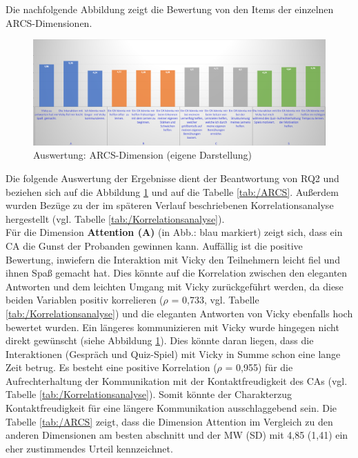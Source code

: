 Die nachfolgende Abbildung zeigt die Bewertung von den Items der einzelnen ARCS-Dimensionen.
\begin{figure}[H]
    \centering
    \includegraphics[width=1\linewidth]{images/Auswertung/ARCS.png}
   \caption[Auswertung: ARCS-Dimensionen ] {Auswertung: ARCS-Dimension (eigene Darstellung)}
  \label{fig:ARCS_Dimension}
\end{figure} 

Die folgende Auswertung der Ergebnisse dient der Beantwortung von RQ2 und beziehen sich auf die Abbildung \ref{fig:ARCS_Dimension}
und auf die Tabelle \ref{tab:/ARCS}. 
Außerdem wurden Bezüge zu der im späteren Verlauf beschriebenen Korrelationsanalyse hergestellt (vgl. Tabelle \ref{tab:/Korrelationsanalyse}).\\
Für die Dimension \textbf{Attention (A)} (in Abb.: blau markiert) zeigt sich, dass ein CA die Gunst der Probanden gewinnen kann.
Auffällig ist die positive Bewertung, inwiefern die Interaktion mit Vicky den Teilnehmern leicht fiel und ihnen Spaß gemacht hat.
Dies könnte auf die Korrelation zwischen den eleganten Antworten und dem leichten Umgang mit Vicky zurückgeführt werden, da
diese beiden Variablen positiv korrelieren ($\rho$ = 0,733, vgl. Tabelle \ref{tab:/Korrelationsanalyse}) und die eleganten Antworten von Vicky ebenfalls hoch bewertet wurden.
Ein längeres kommunizieren mit Vicky wurde hingegen nicht direkt gewünscht (siehe Abbildung \ref{fig:ARCS_Dimension}). Dies könnte 
daran liegen, dass die Interaktionen (Gespräch und Quiz-Spiel) mit Vicky in Summe schon eine lange Zeit betrug.
Es besteht eine positive Korrelation ($\rho$ = 0,955) für die Aufrechterhaltung der Kommunikation mit der Kontaktfreudigkeit des CAs (vgl. Tabelle \ref{tab:/Korrelationsanalyse}).
Somit könnte der Charakterzug Kontaktfreudigkeit für eine längere Kommunikation ausschlaggebend sein.
Die Tabelle \ref{tab:/ARCS} zeigt, dass die Dimension Attention im Vergleich zu den anderen Dimensionen am besten abschnitt
und der MW (SD) mit 4,85 (1,41) ein eher zustimmendes Urteil kennzeichnet.


